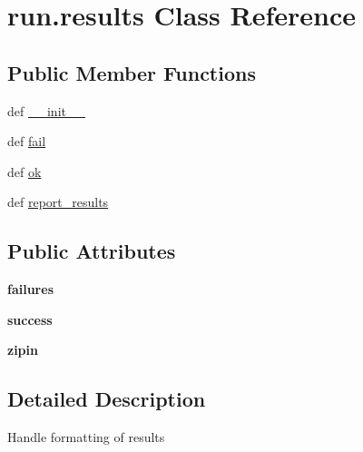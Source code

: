 \hypertarget{classrun_1_1results}{\section{run.\+results Class Reference}
\label{classrun_1_1results}
}
\subsection*{Public Member Functions}
\begin{DoxyCompactItemize}
\item 
def \hyperlink{classrun_1_1results_ae12827faaeff61aeb22238f863d68188}{\+\_\+\+\_\+init\+\_\+\+\_\+}
\item 
def \hyperlink{classrun_1_1results_a6b87845d0ab03183d6a21fe33c9c7c5a}{fail}
\item 
def \hyperlink{classrun_1_1results_a306f2302a73734d1ef759bcfaed55abf}{ok}
\item 
def \hyperlink{classrun_1_1results_ac885571754d46232c80acd7a55a71e17}{report\+\_\+results}
\end{DoxyCompactItemize}
\subsection*{Public Attributes}
\begin{DoxyCompactItemize}
\item 
\hypertarget{classrun_1_1results_aafd3852de9f6e586487677d9f8187637}{{\bfseries failures}}\label{classrun_1_1results_aafd3852de9f6e586487677d9f8187637}

\item 
\hypertarget{classrun_1_1results_aec98d1dd7c1247c7f70889e986b76543}{{\bfseries success}}\label{classrun_1_1results_aec98d1dd7c1247c7f70889e986b76543}

\item 
\hypertarget{classrun_1_1results_ac1b30559841a1dc2c9c4c34c18f57e0e}{{\bfseries zipin}}\label{classrun_1_1results_ac1b30559841a1dc2c9c4c34c18f57e0e}

\end{DoxyCompactItemize}


\subsection{Detailed Description}
\begin{DoxyVerb}Handle formatting of results\end{DoxyVerb}
 

